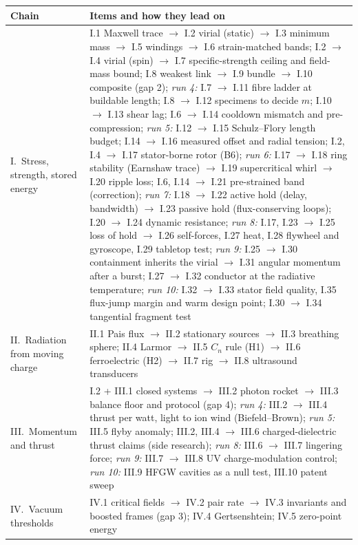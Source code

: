 \documentclass[10pt,a4paper]{article}
\theoremstyle{plain}
\theoremstyle{definition}
\begin{document}
\medskip
\noindent\begin{tabularx}{\textwidth}{@{}lX@{}}
\toprule
Chain & Items and how they lead on\\
\midrule
I.\ Stress, strength, stored energy & I.1 Maxwell trace $\to$ I.2 virial (static) $\to$ I.3 minimum mass $\to$ I.5 windings $\to$ I.6 strain-matched bands;
I.2 $\to$ I.4 virial (spin) $\to$ I.7 specific-strength ceiling and field-mass bound; I.8 weakest link $\to$ I.9 bundle $\to$ I.10 composite (gap 2);
\emph{run 4:} I.7 $\to$ I.11 fibre ladder at buildable length; I.8 $\to$ I.12 specimens to decide $m$; I.10 $\to$ I.13 shear lag;
I.6 $\to$ I.14 cooldown mismatch and pre-compression; \emph{run 5:} I.12 $\to$ I.15 Schulz--Flory length budget;
I.14 $\to$ I.16 measured offset and radial tension; I.2, I.4 $\to$ I.17 stator-borne rotor (B6); \emph{run 6:} I.17 $\to$ I.18 ring
stability (Earnshaw trace) $\to$ I.19 supercritical whirl $\to$ I.20 ripple loss; I.6, I.14 $\to$ I.21 pre-strained band (correction);
\emph{run 7:} I.18 $\to$ I.22 active hold (delay, bandwidth) $\to$ I.23 passive hold (flux-conserving loops); I.20 $\to$ I.24 dynamic resistance; \emph{run 8:} I.17, I.23 $\to$ I.25 loss of hold $\to$ I.26 self-forces, I.27 heat, I.28 flywheel and gyroscope, I.29 tabletop test; \emph{run 9:} I.25 $\to$ I.30 containment inherits the virial $\to$ I.31 angular momentum after a burst; I.27 $\to$ I.32 conductor at the radiative temperature; \emph{run 10:} I.32 $\to$ I.33 stator field quality, I.35 flux-jump margin and warm design point; I.30 $\to$ I.34 tangential fragment test\\
II.\ Radiation from moving charge & II.1 Pais flux $\to$ II.2 stationary sources $\to$ II.3 breathing sphere; II.4 Larmor $\to$ II.5 $C_n$ rule (H1) $\to$ II.6 ferroelectric (H2) $\to$ II.7 rig $\to$ II.8 ultrasound transducers\\
III.\ Momentum and thrust & I.2 + III.1 closed systems $\to$ III.2 photon rocket $\to$ III.3 balance floor and protocol (gap 4);
\emph{run 4:} III.2 $\to$ III.4 thrust per watt, light to ion wind (Biefeld--Brown); \emph{run 5:} III.5 flyby anomaly;
III.2, III.4 $\to$ III.6 charged-dielectric thrust claims (side research); \emph{run 8:} III.6 $\to$ III.7 lingering force; \emph{run 9:} III.7 $\to$ III.8 UV charge-modulation control; \emph{run 10:} III.9 HFGW cavities as a null test, III.10 patent sweep\\
IV.\ Vacuum thresholds & IV.1 critical fields $\to$ IV.2 pair rate $\to$ IV.3 invariants and boosted frames (gap 3); IV.4 Gertsenshtein; IV.5 zero-point energy\\

\end{tabularx}
\end{document}
